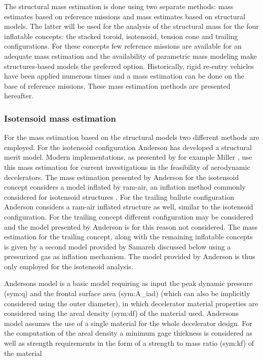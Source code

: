 The structural mass estimation is done using two separate methods: mass estimates based on reference missions and mass estimates based on structural models. The latter will be used for the analysis of the structural mass for the four inflatable concepts: the stacked toroid, isotensoid, tension cone and trailing configurations. For these concepts few reference missions are available for an adequate mass estimation and the availability of parametric mass modeling \cite{Anderson1969, Samareh2011} make structures-based models the preferred option. Historically, rigid re-entry vehicles have been applied numerous times and a mass estimation can be done on the base of reference missions. These mass estimation methods are presented hereafter.

\subsubsection{Isotensoid mass estimation}
For the mass estimation based on the structural models two different methods are employed. For the isotensoid configuration Anderson \cite{Anderson1969} has developed a structural merit model. Modern implementations, as presented by for example Miller \cite{Miller2014}, use this mass estimation for current investigations in the feasibility of aerodynamic decelerators. The mass estimation presented by Anderson for the isotensoid concept considers a model inflated by ram-air, an inflation method commonly considered for isotensoid structures \cite{Smith2011}. For the trailing ballute configuration Anderson considers a ram-air inflated structure as well, similar to the isotensoid configuration. For the trailing concept different configuration may be considered and the model presented by Anderson is for this reason not considered. The mass estimation for the trailing concept, along with the remaining inflatable concepts is given by a second model provided by Samareh \cite{Samareh2011} discussed below using a pressurized gas as inflation mechanism. The model provided by Anderson is thus only employed for the isotensoid analysis. 

Andersons model \cite{anderson 1969} is a basic model requiring as input the peak dynamic pressure (\gls{sym:q}) and the frontal surface area (\gls{sym:A_iad}) (which can also be implicitly considered using the outer diameter), in which decelerator material properties are considered using the areal density (\gls{sym:df}) of the material used. Andersons model assumes the use of a single material for the whole decelerator design. For the computation of the areal density a minimum gage thickness is considered as well as strength requirements in the form of a strength to mass ratio (\gls{sym:kf}) of the material

